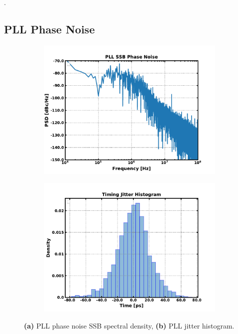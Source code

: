 {\color{white}.}
\FloatBarrier


\subsection{PLL Phase Noise}

	\begin{figure}[htb!]
	    \centering
	    \begin{subfigure}{0.5\textwidth}
	        \centering
	        \includegraphics[width=1\textwidth, angle=0]{./figs/results/pll_pn_final_100u}
	        \caption{ }
	        \label{fig:sim_pll_psd}
	    \end{subfigure}%
	    \begin{subfigure}{0.5\textwidth}
	        \centering
	        \includegraphics[width=1\textwidth, angle=0]{./figs/results/jitter_hist}
	        \caption{ }
	        \label{fig:pll_jit_hist}
	    \end{subfigure}
	    \caption{\textbf{(a)} PLL phase noise SSB spectral density, \textbf{(b)} PLL jitter histogram.}
	    \label{fig:pll_pn_jit}
	\end{figure} 

